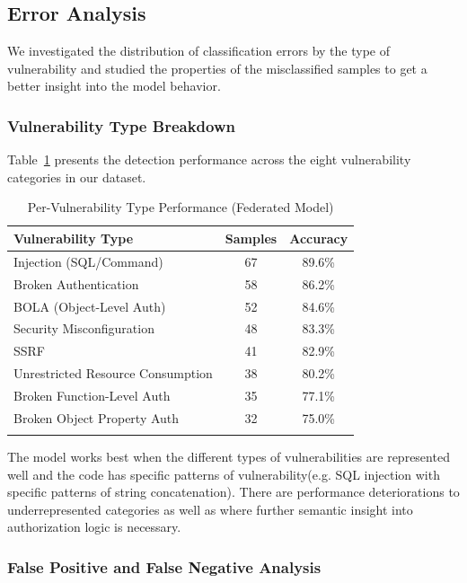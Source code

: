 \documentclass[pdflatex,sn-mathphys-num]{sn-jnl}
\theoremstyle{thmstyleone}%
\theoremstyle{thmstyletwo}%
\theoremstyle{thmstylethree}%
\begin{document}
\subsection{Error Analysis}\label{subsec:error_analysis}

We investigated the distribution of classification errors by the type of vulnerability and studied the properties of the misclassified samples to get a better insight into the model behavior.

\subsubsection{Vulnerability Type Breakdown}

Table~\ref{tab:vuln_breakdown} presents the detection performance across the eight vulnerability categories in our dataset.

\begin{table}[h]
\caption{Per-Vulnerability Type Performance (Federated Model)}\label{tab:vuln_breakdown}
\footnotesize
\begin{tabular}{@{}lcc@{}}
\toprule
\textbf{Vulnerability Type} & \textbf{Samples} & \textbf{Accuracy} \\
\midrule
Injection (SQL/Command) & 67 & 89.6\% \\
Broken Authentication & 58 & 86.2\% \\
BOLA (Object-Level Auth) & 52 & 84.6\% \\
Security Misconfiguration & 48 & 83.3\% \\
SSRF & 41 & 82.9\% \\
Unrestricted Resource Consumption & 38 & 80.2\% \\
Broken Function-Level Auth & 35 & 77.1\% \\
Broken Object Property Auth & 32 & 75.0\% \\
\botrule
\end{tabular}
\end{table}

The model works best when the different types of vulnerabilities are represented well and the code has specific patterns of vulnerability(e.g. SQL injection with specific patterns of string concatenation). There are performance deteriorations to underrepresented categories as well as where further semantic insight into authorization logic is necessary.

\subsubsection{False Positive and False Negative Analysis}
\end{document}
